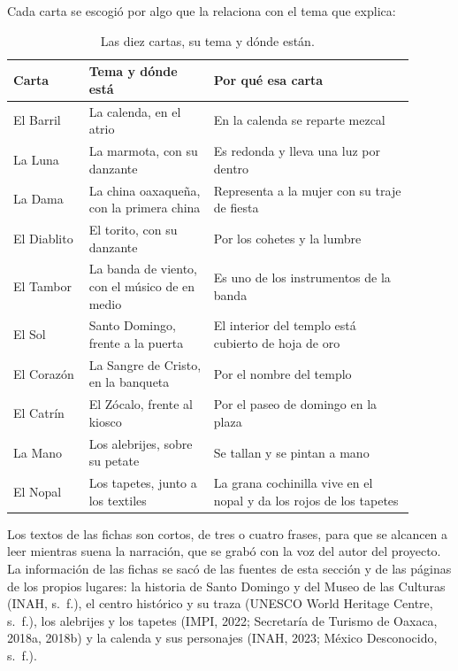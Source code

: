 \documentclass[11pt,a4paper]{article}
\begin{document}
Cada carta se escogió por algo que la relaciona con el tema que explica:

\begin{table}[H]
  \centering
  \small
  \begin{tabular}{|p{0.17\linewidth}|p{0.28\linewidth}|p{0.45\linewidth}|}
    \hline
    \textbf{Carta} & \textbf{Tema y dónde está} & \textbf{Por qué esa carta} \\ \hline
    El Barril & La calenda, en el atrio & En la calenda se reparte mezcal \\ \hline
    La Luna & La marmota, con su danzante & Es redonda y lleva una luz por dentro \\ \hline
    La Dama & La china oaxaqueña, con la primera china & Representa a la mujer con su traje de fiesta \\ \hline
    El Diablito & El torito, con su danzante & Por los cohetes y la lumbre \\ \hline
    El Tambor & La banda de viento, con el músico de en medio & Es uno de los instrumentos de la banda \\ \hline
    El Sol & Santo Domingo, frente a la puerta & El interior del templo está cubierto de hoja de oro \\ \hline
    El Corazón & La Sangre de Cristo, en la banqueta & Por el nombre del templo \\ \hline
    El Catrín & El Zócalo, frente al kiosco & Por el paseo de domingo en la plaza \\ \hline
    La Mano & Los alebrijes, sobre su petate & Se tallan y se pintan a mano \\ \hline
    El Nopal & Los tapetes, junto a los textiles & La grana cochinilla vive en el nopal y da los rojos de los tapetes \\ \hline
  \end{tabular}
  \caption{Las diez cartas, su tema y dónde están.}
\end{table}

Los textos de las fichas son cortos, de tres o cuatro frases, para que se alcancen a leer mientras suena la narración, que se grabó con la voz del autor del proyecto. La información de las fichas se sacó de las fuentes de esta sección y de las páginas de los propios lugares: la historia de Santo Domingo y del Museo de las Culturas (INAH, s.~f.), el centro histórico y su traza (UNESCO World Heritage Centre, s.~f.), los alebrijes y los tapetes (IMPI, 2022; Secretaría de Turismo de Oaxaca, 2018a, 2018b) y la calenda y sus personajes (INAH, 2023; México Desconocido, s.~f.).
\end{document}
